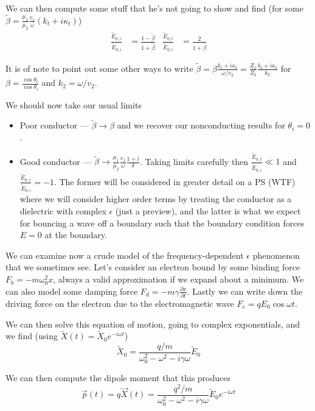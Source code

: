 \documentclass[10pt]{report}
\newcommand{\pd}[2]{\frac{\partial #1}{\partial#2}}
\begin{document}
We can then compute some stuff that he's not going to show and find (for some $\tilde{\beta} = \frac{\mu_1}{\mu_2}\frac{v_1}{\omega}(k_t + i\kappa_t)$)
\begin{align}
    \frac{\tilde{E}_{0,r}}{\tilde{E}_{0,i}} &= \frac{1 - \tilde{\beta}}{1 + \tilde{\beta}} & \frac{\tilde{E}_{0,t}}{\tilde{E}_{0,i}} &= \frac{2}{1 + \tilde{\beta}}
\end{align}

It is of note to point out some other ways to write $\tilde{\beta} = \beta \frac{k_t + i\kappa_t}{\omega / v_2} = \frac{Z_1}{Z_2} \frac{k_t + i\kappa_t}{k_2}$ for $\beta = \frac{\cos \theta_t}{\cos \theta_i}$ and $k_2 = \omega/v_2$.

We should now take our usual limits
\begin{itemize}
    \item Poor conductor --- $\tilde{\beta} \to \beta$ and we recover our nonconducting results for $\theta_i = 0$. 
    \item Good conductor --- $\tilde{\beta} \to \frac{\mu_1}{\mu_2}\frac{v_1}{\omega}\frac{1 + i}{\delta}$. Taking limits carefully then $\frac{\tilde{E}_{0,t}}{\tilde{E}_{0,i}} \ll 1$ and $\frac{\tilde{E}_{0,r}}{\tilde{E}_{0,i}} = -1$. The former will be considered in greater detail on a PS (WTF) where we will consider higher order terms by treating the conductor as a dielectric with complex $\epsilon$ (just a preview), and the latter is what we expect for bouncing a wave off a boundary such that the boundary condition forces $E = 0$ at the boundary.
\end{itemize}

We can examine now a crude model of the frequency-dependent $\epsilon$ phenomenon that we sometimes see. Let's consider an electron bound by some binding force $F_b = -m\omega_0^2x$, always a valid approximation if we expand about a minimum. We can also model some damping force $F_d = -m\gamma \pd{x}{t}$. Lastly we can write down the driving force on the electron due to the electromagnetic wave $F_e = qE_0\cos\omega t$.

We can then solve this equation of motion, going to complex exponentials, and we find (using $\tilde{X}(t) = \tilde{X}_0e^{-i\omega t}$)
\begin{equation}
    \tilde{X}_0  = \frac{q/m}{\omega_0^2 - \omega^2 - i\gamma \omega}\tilde{E}_0
\end{equation}

We can then compute the dipole moment that this produces 
\begin{equation}
    \vec{p}(t) = q\vec{X}(t) = \frac{q^2/m}{\omega_0^2 - \omega^2 - i\gamma \omega}\tilde{E}_0 e^{-i\omega t}
\end{equation}
\end{document}
